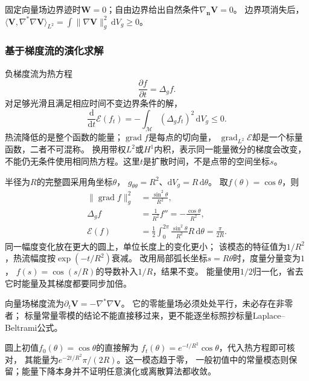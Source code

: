 固定向量场边界迹时$\bm W=0$；自由边界给出自然条件$\nabla_{\bm n}\bm V=0$。
边界项消失后，
$\langle\bm V,\nabla^*\nabla\bm V\rangle_{L^2}
=\int\lVert\nabla\bm V\rVert_g^2\,\mathrm dV_g\geq0$。

\subsubsection{基于梯度流的演化求解}
\label{sec:functional-gradient-flow-solvers}

负梯度流为热方程
\begin{equation}
 \frac{\partial f}{\partial t}=\Delta_gf.
 \label{eq:geometry-heat-equation}
\end{equation}
对足够光滑且满足相应时间不变边界条件的解，
\[
 \frac{\mathrm d}{\mathrm dt}\mathcal E(f_t)
 =-\int_{\mathcal M}(\Delta_gf_t)^2\,\mathrm dV_g\leq0.
\]
热流降低的是整个函数的能量；$\operatorname{grad}f$是每点的切向量，
$\operatorname{grad}_{L^2}\mathcal E$却是一个标量函数，二者不可混称。
换用带权$L^2$或$H^1$内积，表示同一能量微分的梯度会改变，
不能仍无条件使用相同热方程。这里$t$是扩散时间，不是点带的空间坐标$s$。


\begin{example}
\label{ex:geometry-circle-energy-scale}
半径为$R$的完整圆采用角坐标$\theta$，
$g_{\theta\theta}=R^2$、$\mathrm dV_g=R\,\mathrm d\theta$。
取$f(\theta)=\cos\theta$，则
\[
 \begin{aligned}
 \lVert\operatorname{grad}f\rVert_g^2&=\frac{\sin^2\theta}{R^2},\\
 \Delta_gf&=\frac1{R^2}f''=-\frac{\cos\theta}{R^2},\\
 \mathcal E(f)&=\frac12\int_0^{2\pi}
        \frac{\sin^2\theta}{R^2}R\,\mathrm d\theta=\frac{\pi}{2R}.
 \end{aligned}
\]
同一幅度变化放在更大的圆上，单位长度上的变化更小；
该模态的特征值为$1/R^2$，热流幅度按$\exp(-t/R^2)$衰减。
改用局部弧长坐标$s=R\theta$时，度量分量变为$1$，
$f(s)=\cos(s/R)$的导数补入$1/R$，结果不变。
能量使用$1/2$归一化，省去它时能量及其梯度都要同步加倍。
\end{example}


向量场梯度流为$\partial_t\bm V=-\nabla^*\nabla\bm V$。
它的零能量场必须处处平行，未必存在非零者；
标量常量零模的结论不能直接移过来，更不能逐坐标照抄标量Laplace--Beltrami公式。


圆上初值$f_0(\theta)=\cos\theta$的直接解为
$f_t(\theta)=e^{-t/R^2}\cos\theta$，代入热方程即可核对，
其能量为$e^{-2t/R^2}\pi/(2R)$。这一模态趋于零，
一般初值中的常量模态则保留；能量下降本身并不证明任意演化或离散算法都收敛。

